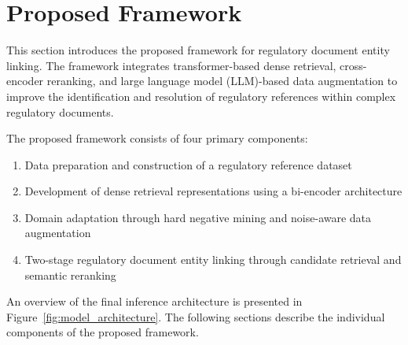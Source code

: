 \section{Proposed Framework}

This section introduces the proposed framework for regulatory document entity linking. The framework integrates transformer-based dense retrieval, cross-encoder reranking, and large language model (LLM)-based data augmentation to improve the identification and resolution of regulatory references within complex regulatory documents.

The proposed framework consists of four primary components:

\begin{enumerate}
    \item Data preparation and construction of a regulatory reference dataset
    \item Development of dense retrieval representations using a bi-encoder architecture
    \item Domain adaptation through hard negative mining and noise-aware data augmentation
    \item Two-stage regulatory document entity linking through candidate retrieval and semantic reranking
\end{enumerate}

An overview of the final inference architecture is presented in Figure~\ref{fig:model_architecture}. The following sections describe the individual components of the proposed framework.

